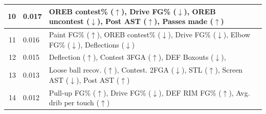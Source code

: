 \begin{tabular}{rlll}
\midrule
10 & 0.017 & OREB contest\% ($\uparrow$), Drive FG\% ($\downarrow$), OREB uncontest ($\downarrow$), Post AST ($\uparrow$), Passes made ($\uparrow$) &  \\
\midrule
11 & 0.016 & Paint FG\% ($\uparrow$), OREB contest\% ($\downarrow$), Drive FG\% ($\downarrow$), Elbow FG\% ($\downarrow$), Deflections ($\downarrow$) &  \\
\midrule
12 & 0.015 & Deflection ($\uparrow$), Contest 3FGA ($\uparrow$), DEF Boxouts ($\downarrow$), &  \\
\midrule
13 & 0.013 & Loose ball recov. ($\uparrow$), Contest. 2FGA ($\downarrow$), STL ($\uparrow$), Screen AST ($\downarrow$), Post AST ($\uparrow$) &  \\
\midrule
14 & 0.012 & Pull-up FG\% ($\uparrow$), Drive FG\% ($\downarrow$), DEF RIM FG\% ($\uparrow$), Avg. drib per touch ($\uparrow$) &  \\
\bottomrule
\end{tabular}
